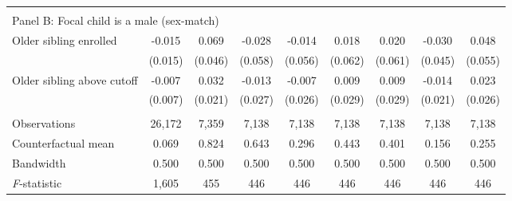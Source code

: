 {{\begin{tabular}{lcccccccc}
&  &  &  & & & & & \\
\multicolumn{10}{l}{Panel B: Focal child is a male (sex-match)} \\
Older sibling enrolled&      -0.015   &       0.069   &      -0.028   &      -0.014   &       0.018   &       0.020   &      -0.030   &       0.048   \\
                    &     (0.015)   &     (0.046)   &     (0.058)   &     (0.056)   &     (0.062)   &     (0.061)   &     (0.045)   &     (0.055)   \\
 
Older sibling above cutoff&      -0.007   &       0.032   &      -0.013   &      -0.007   &       0.009   &       0.009   &      -0.014   &       0.023   \\
                    &     (0.007)   &     (0.021)   &     (0.027)   &     (0.026)   &     (0.029)   &     (0.029)   &     (0.021)   &     (0.026)   \\
                    &               &               &               &               &               &               &               &               \\
Observations        &      26,172   &       7,359   &       7,138   &       7,138   &       7,138   &       7,138   &       7,138   &       7,138   \\
Counterfactual mean &       0.069   &       0.824   &       0.643   &       0.296   &       0.443   &       0.401   &       0.156   &       0.255   \\
Bandwidth           &       0.500   &       0.500   &       0.500   &       0.500   &       0.500   &       0.500   &       0.500   &       0.500   \\
\textit{F}-statistic&       1,605   &         455   &         446   &         446   &         446   &         446   &         446   &         446   \\
 

\bottomrule
\end{tabular}
}
}
